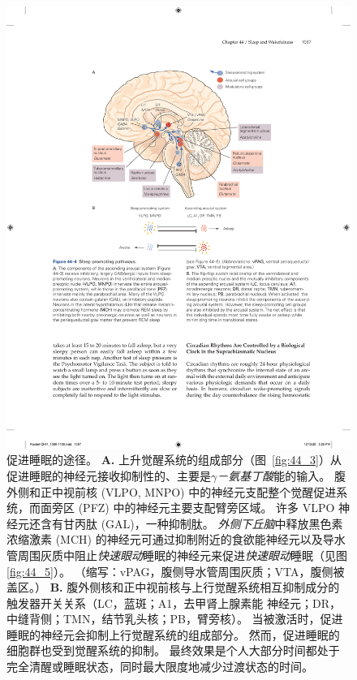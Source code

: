 \begin{figure}[htbp]
	\centering
	\includegraphics[width=0.7\linewidth]{chap44/fig_44_4}
	\caption{促进睡眠的途径。
		\textbf{A.} 上升觉醒系统的组成部分（图~\ref{fig:44_3}）从促进睡眠的神经元接收抑制性的、主要是\textit{$\gamma$－氨基丁酸}能的输入。
		腹外侧和正中视前核 (VLPO, MNPO) 中的神经元支配整个觉醒促进系统，而面旁区 (PFZ) 中的神经元主要支配臂旁区域。
		许多 VLPO 神经元还含有甘丙肽 (GAL)，一种抑制肽。
		\textit{外侧下丘脑}中释放黑色素浓缩激素 (MCH) 的神经元可通过抑制附近的食欲能神经元以及导水管周围灰质中阻止\textit{快速眼动}睡眠的神经元来促进\textit{快速眼动}睡眠（见图 \ref{fig:44_5}）。
		（缩写：vPAG，腹侧导水管周围灰质；VTA，腹侧被盖区。）
		\textbf{B.} 腹外侧核和正中视前核与上行觉醒系统相互抑制成分的触发器开关关系（LC，蓝斑；A1，去甲肾上腺素能 神经元；DR，中缝背侧；TMN，结节乳头核；PB，臂旁核）。
		当被激活时，促进睡眠的神经元会抑制上行觉醒系统的组成部分。
		然而，促进睡眠的细胞群也受到觉醒系统的抑制。
		最终效果是个人大部分时间都处于完全清醒或睡眠状态，同时最大限度地减少过渡状态的时间。}
	\label{fig:44_4}
\end{figure}


